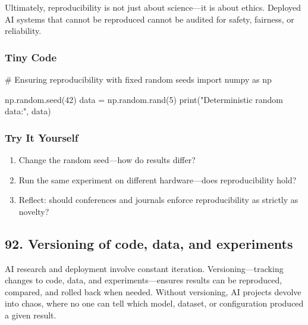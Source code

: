 \documentclass[
  letterpaper,
  DIV=11,
  numbers=noendperiod]{scrreprt}
\newenvironment{Shaded}{\begin{snugshade}}{\end{snugshade}}
\newcommand{\BuiltInTok}[1]{\textcolor[rgb]{0.00,0.23,0.31}{#1}}
\newcommand{\CommentTok}[1]{\textcolor[rgb]{0.37,0.37,0.37}{#1}}
\newcommand{\DecValTok}[1]{\textcolor[rgb]{0.68,0.00,0.00}{#1}}
\newcommand{\ImportTok}[1]{\textcolor[rgb]{0.00,0.46,0.62}{#1}}
\newcommand{\NormalTok}[1]{\textcolor[rgb]{0.00,0.23,0.31}{#1}}
\newcommand{\OperatorTok}[1]{\textcolor[rgb]{0.37,0.37,0.37}{#1}}
\newcommand{\StringTok}[1]{\textcolor[rgb]{0.13,0.47,0.30}{#1}}
\providecommand{\tightlist}{%
  \setlength{\itemsep}{0pt}\setlength{\parskip}{0pt}}
\begin{document}
Ultimately, reproducibility is not just about science---it is about
ethics. Deployed AI systems that cannot be reproduced cannot be audited
for safety, fairness, or reliability.

\subsubsection{Tiny Code}\label{tiny-code-90}

\begin{Shaded}
\begin{Highlighting}[]
\CommentTok{\# Ensuring reproducibility with fixed random seeds}
\ImportTok{import}\NormalTok{ numpy }\ImportTok{as}\NormalTok{ np}

\NormalTok{np.random.seed(}\DecValTok{42}\NormalTok{)}
\NormalTok{data }\OperatorTok{=}\NormalTok{ np.random.rand(}\DecValTok{5}\NormalTok{)}
\BuiltInTok{print}\NormalTok{(}\StringTok{"Deterministic random data:"}\NormalTok{, data)}
\end{Highlighting}
\end{Shaded}

\subsubsection{Try It Yourself}\label{try-it-yourself-90}

\begin{enumerate}
\def\labelenumi{\arabic{enumi}.}
\tightlist
\item
  Change the random seed---how do results differ?
\item
  Run the same experiment on different hardware---does reproducibility
  hold?
\item
  Reflect: should conferences and journals enforce reproducibility as
  strictly as novelty?
\end{enumerate}

\subsection{92. Versioning of code, data, and
experiments}\label{versioning-of-code-data-and-experiments}

AI research and deployment involve constant iteration.
Versioning---tracking changes to code, data, and experiments---ensures
results can be reproduced, compared, and rolled back when needed.
Without versioning, AI projects devolve into chaos, where no one can
tell which model, dataset, or configuration produced a given result.
\end{document}
